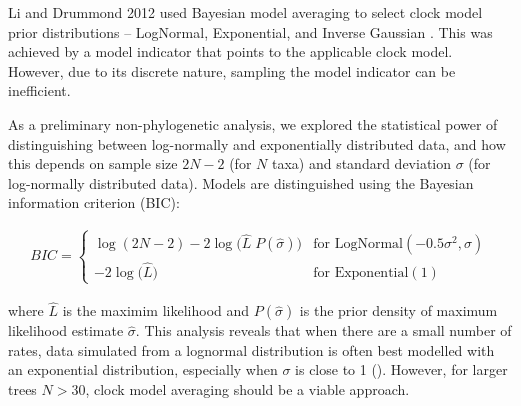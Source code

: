 \documentclass[10pt,letterpaper]{article}
\begin{document}
Li and Drummond 2012 used Bayesian model averaging to select clock model prior distributions -- LogNormal, Exponential, and Inverse Gaussian \cite{li2012model}. This was achieved by a model indicator that points to the applicable clock model. However, due to its discrete nature, sampling the model indicator can be inefficient.  






As a preliminary non-phylogenetic analysis, we explored the statistical power of distinguishing between log-normally and exponentially distributed data, and how this depends on sample size $2N-2$ (for $N$ taxa) and standard deviation $\sigma$ (for log-normally distributed data). Models are distinguished using the Bayesian information criterion (BIC):


\begin{align}
	BIC = \begin{cases} \log(2N-2) - 2 \log \big( \hat{L} \; P(\hat{\sigma}) \big) & \text{for LogNormal}(-0.5\sigma^2, \sigma) \\ 
	- 2 \log \big( \hat{L} \big) & \text{for Exponential}(1) \end{cases}
\end{align}


where $\hat{L}$ is the maximim likelihood and $P(\hat{\sigma})$ is the prior density of maximum likelihood estimate $\hat{\sigma}$. This analysis reveals that when there are a small number of rates, data simulated from a lognormal distribution is often best modelled with an exponential distribution, especially when $\sigma$ is close to 1 (). However, for larger trees $N > 30$, clock model averaging should be a viable approach. 
\end{document}
